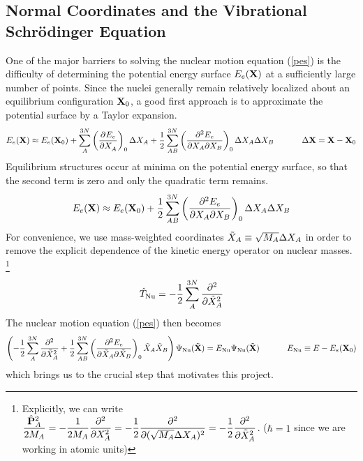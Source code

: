 \documentclass[11pt]{article}
\begin{document}
\subsection{Normal Coordinates and the Vibrational Schr\"odinger Equation}
One of the major barriers to solving the nuclear motion equation (\ref{pes}) is the difficulty of determining the potential energy surface $E_e(\mathbf{X})$ at a sufficiently large number of points.
Since the nuclei generally remain relatively localized about an equilibrium configuration $\mathbf{X}_0$, a good first approach is to approximate the potential surface by a Taylor expansion.
\begin{align*}
	E_e(\mathbf{X})
\approx
	E_e(\mathbf{X}_0)
+\sum_A^{3N}
	\left( \dfrac{ \partial^{} E_e }{\partial X_A ^{}}\right)_0
	\Delta X_A
+\dfrac{1}{2}\sum_{AB}^{3N}
	\left(\dfrac{\partial^2E_e}{\partial X_A\partial X_B}\right)_0
	\Delta X_A
	\Delta X_B
	\ \ \ \ \ \ \ \ \ \  \Delta\mathbf{X}=\mathbf{X}-\mathbf{X}_0
\end{align*}
Equilibrium structures occur at minima on the potential energy surface, so that the second term is zero and only the quadratic term remains.
\begin{align}
	E_e(\mathbf{X})
\approx
	E_e(\mathbf{X}_0)
+\dfrac{1}{2}\sum_{AB}^{3N}
	\left(\dfrac{\partial^2E_e}{\partial X_A\partial X_B}\right)_0
	\Delta X_A
	\Delta X_B
\end{align}
For convenience, we use mass-weighted coordinates $\tilde{X}_A \equiv \sqrt{M_A}\Delta X_A$
in order to remove the explicit dependence of the kinetic energy operator on nuclear masses. \footnote{Explicitly, we can write $\dfrac{\hat{\mathbf{P}}_A^2}{2M_A} = -\dfrac{1}{2M_A}  \dfrac{ \partial^{2}  }{\partial X_A ^{2}}=-\dfrac{1}{2} \dfrac{ \partial^{2}  }{\partial (\sqrt{M_A}\Delta X_A) ^{2}}=-\dfrac{1}{2} \dfrac{ \partial^{2}  }{\partial \tilde{X}_A ^{2}}$. ($\hbar=1$ since we are working in atomic units)}
\begin{align}
	\hat{T}_{\mathrm{Nu}}
=
	-\dfrac{1}{2}\sum_A^{3N}  \dfrac{ \partial^{2}  }{\partial \tilde{X}_A ^{2}}
\end{align}
The nuclear motion equation (\ref{pes}) then becomes
\begin{align}
\label{pes-intermediate}
\left(
-\dfrac{1}{2}\sum_A^{3N}
	 \dfrac{ \partial^{2}  }{\partial \tilde{X}_A ^{2}}
+\dfrac{1}{2}\sum_{AB}^{3N}
	\left(\dfrac{\partial^2E_e}{\partial \tilde{X}_A\partial \tilde{X}_B}\right)_0
	\tilde{X}_A
	\tilde{X}_B
\right)
	\Psi_{\mathrm{Nu}}(\tilde{\mathbf{X}})
=
	E_{\mathrm{Nu}}
	\Psi_{\mathrm{Nu}}(\tilde{\mathbf{X}})
\ \ \ \ \ \ \ \ \ \ 
	E_{\mathrm{Nu}}
\equiv
	E - E_e(\mathbf{X}_0)
\end{align}
which brings us to the crucial step that motivates this project.
\end{document}
